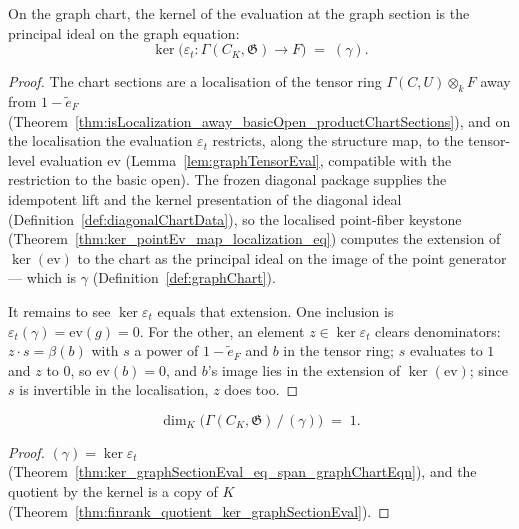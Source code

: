 \begin{theorem}
  \label{thm:ker_graphSectionEval_eq_span_graphChartEqn}
  \leanok
  On the graph chart, the kernel of the evaluation at the graph section is the principal
  ideal on the graph equation:
  \[
    \ker\bigl(\varepsilon_t \colon \Gamma(C_K, \mathfrak G) \to F\bigr)
      \;=\; (\gamma).
  \]
\end{theorem}
\begin{proof}
  \leanok
  The chart sections are a localisation of the tensor ring \(\Gamma(C,U) \otimes_k F\)
  away from \(1 - \tilde e_F\)
  (Theorem~\ref{thm:isLocalization_away_basicOpen_productChartSections}), and on the
  localisation the evaluation \(\varepsilon_t\) restricts, along the structure map, to the
  tensor-level evaluation \(\mathrm{ev}\) (Lemma~\ref{lem:graphTensorEval}, compatible with
  the restriction to the basic open). The frozen diagonal package supplies the idempotent
  lift and the kernel presentation of the diagonal ideal
  (Definition~\ref{def:diagonalChartData}), so the localised point-fiber keystone
  (Theorem~\ref{thm:ker_pointEv_map_localization_eq}) computes the extension of
  \(\ker(\mathrm{ev})\) to the chart as the principal ideal on the image of the point
  generator — which is \(\gamma\) (Definition~\ref{def:graphChart}).

  It remains to see \(\ker \varepsilon_t\) equals that extension. One inclusion is
  \(\varepsilon_t(\gamma) = \mathrm{ev}(g) = 0\). For the other, an element
  \(z \in \ker\varepsilon_t\) clears denominators: \(z \cdot s = \beta(b)\) with \(s\) a
  power of \(1 - \tilde e_F\) and \(b\) in the tensor ring; \(s\) evaluates to \(1\) and
  \(z\) to \(0\), so \(\mathrm{ev}(b) = 0\), and \(b\)'s image lies in the extension of
  \(\ker(\mathrm{ev})\); since \(s\) is invertible in the localisation, \(z\) does too.
\end{proof}

\begin{theorem}
  \label{thm:finrank_quotient_span_graphChartEqn}
  \leanok
  \[
    \dim_K \bigl(\Gamma(C_K, \mathfrak G) \,/\, (\gamma)\bigr) \;=\; 1 .
  \]
\end{theorem}
\begin{proof}
  \leanok
  \((\gamma) = \ker\varepsilon_t\)
  (Theorem~\ref{thm:ker_graphSectionEval_eq_span_graphChartEqn}), and the quotient by the
  kernel is a copy of \(K\)
  (Theorem~\ref{thm:finrank_quotient_ker_graphSectionEval}).
\end{proof}


